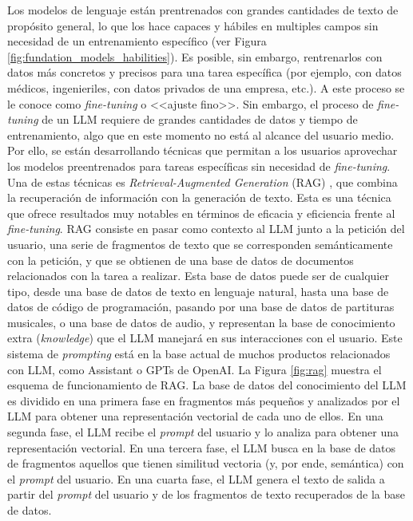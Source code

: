 Los modelos de lenguaje están prentrenados con grandes cantidades de texto de propósito general, lo que los hace capaces y hábiles en multiples campos sin necesidad de un entrenamiento específico (ver Figura \ref{fig:fundation_models_habilities}). Es posible, sin embargo, rentrenarlos con datos más concretos y precisos para una tarea específica (por ejemplo, con datos médicos, ingenieriles, con datos privados de una empresa, etc.). A este proceso se le conoce como \textit{fine-tuning} o <<ajuste fino>>. Sin embargo, el proceso de \textit{fine-tuning} de un LLM requiere de grandes cantidades de datos y tiempo de entrenamiento, algo que en este momento no está al alcance del usuario medio. Por ello, se están desarrollando técnicas que permitan a los usuarios aprovechar los modelos preentrenados para tareas específicas sin necesidad de \textit{fine-tuning}. Una de estas técnicas es \textit{Retrieval-Augmented Generation} (RAG) \citep{WhatRetrievalaugmentedGeneration2021}, que combina la recuperación de información con la generación de texto. Esta es una técnica que ofrece resultados muy notables en términos de eficacia y eficiencia frente al \textit{fine-tuning}. RAG consiste en pasar como contexto al LLM junto a la petición del usuario, una serie de fragmentos de texto que se corresponden semánticamente con la petición, y que se obtienen de una base de datos de documentos relacionados con la tarea a realizar. Esta base de datos puede ser de cualquier tipo, desde una base de datos de texto en lenguaje natural, hasta una base de datos de código de programación, pasando por una base de datos de partituras musicales, o una base de datos de audio, y representan la base de conocimiento extra (\textit{knowledge}) que el LLM manejará en sus interacciones con el usuario. Este sistema de \textit{prompting} está en la base actual de muchos productos relacionados con LLM, como Assistant o GPTs de OpenAI. La Figura \ref{fig:rag} muestra el esquema de funcionamiento de RAG. La base de datos del conocimiento del LLM es dividido en una primera fase en fragmentos más pequeños y analizados por el LLM para obtener una representación vectorial de cada uno de ellos. En una segunda fase, el LLM recibe el \textit{prompt} del usuario y lo analiza para obtener una representación vectorial. En una tercera fase, el LLM busca en la base de datos de fragmentos aquellos que tienen similitud vectoria (y, por ende, semántica) con el \textit{prompt} del usuario. En una cuarta fase, el LLM genera el texto de salida a partir del \textit{prompt} del usuario y de los fragmentos de texto recuperados de la base de datos. 



